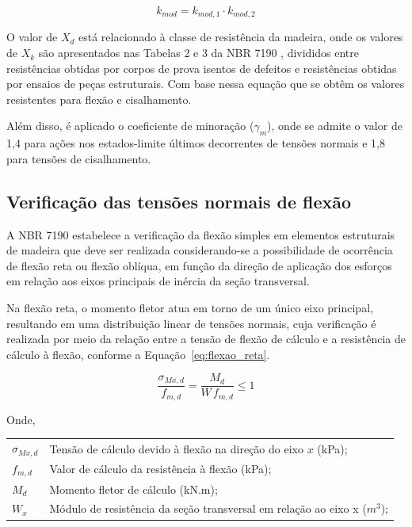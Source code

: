 \begin{quadro}[htpb!]
\begin{equation}
    k_{mod} = k_{mod,1} \cdot k_{mod,2}
    \label{eq:2.11}
\end{equation}

O valor de $X_d$ está relacionado à classe de resistência da madeira, onde os valores de $X_k$ são apresentados nas Tabelas 2 e 3 da NBR 7190 \parencite{NBR7190-1:2022}, divididos entre resistências obtidas por corpos de prova isentos de defeitos e resistências obtidas por ensaios de peças estruturais. Com base nessa equação que se obtêm os valores resistentes para flexão e cisalhamento.

Além disso, é aplicado o coeficiente de minoração ($\gamma_m$), onde se admite o valor de 1,4 para ações nos estados-limite últimos decorrentes de tensões normais e 1,8 para tensões de cisalhamento.

\subsection{Verificação das tensões normais de flexão}

A NBR 7190 \parencite{NBR7190-1:2022} estabelece a verificação da flexão simples em elementos estruturais de madeira que deve ser realizada considerando-se a possibilidade de ocorrência de flexão reta ou flexão oblíqua, em função da direção de aplicação dos esforços em relação aos eixos principais de inércia da seção transversal.

Na flexão reta, o momento fletor atua em torno de um único eixo principal, resultando em uma distribuição linear de tensões normais, cuja verificação é realizada por meio da relação entre a tensão de flexão de cálculo e a resistência de cálculo à flexão, conforme a Equação~\eqref{eq:flexao_reta}.

\begin{equation}
\frac{\sigma_{Mx,d}}{f_{m,d}} = \frac{M_d}{W \, f_{m,d}} \leq 1
\label{eq:flexao_reta}
\end{equation}

Onde,

\begin{tabular}{ll}
$\sigma_{Mx,d}$ & Tensão de cálculo devido à flexão na direção do eixo $x$ (kPa);\\
$f_{m,d}$ & Valor de cálculo da resistência à flexão (kPa);\\
$M_d$ & Momento fletor de cálculo (kN.m);\\
$W_x$ & Módulo de resistência da seção transversal em relação ao eixo x ($m^3$);\\
\end{tabular}


\end{quadro}
